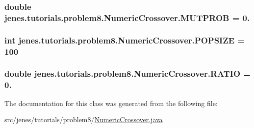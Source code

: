 \hypertarget{classjenes_1_1tutorials_1_1problem8_1_1_numeric_crossover_a4d0587e4b39b1f74efd20a0c921c38f7}{
\subsubsection[{M\-U\-T\-P\-R\-O\-B}]{\setlength{\rightskip}{0pt plus 5cm}double jenes.\-tutorials.\-problem8.\-Numeric\-Crossover.\-M\-U\-T\-P\-R\-O\-B = 0.\hspace{0.3cm}{\ttfamily [static]}}}\label{classjenes_1_1tutorials_1_1problem8_1_1_numeric_crossover_a4d0587e4b39b1f74efd20a0c921c38f7}
\hypertarget{classjenes_1_1tutorials_1_1problem8_1_1_numeric_crossover_a0a9b3b839ab6677dcbae723434df6551}{
\subsubsection[{P\-O\-P\-S\-I\-Z\-E}]{\setlength{\rightskip}{0pt plus 5cm}int jenes.\-tutorials.\-problem8.\-Numeric\-Crossover.\-P\-O\-P\-S\-I\-Z\-E = 100\hspace{0.3cm}{\ttfamily [static]}}}\label{classjenes_1_1tutorials_1_1problem8_1_1_numeric_crossover_a0a9b3b839ab6677dcbae723434df6551}
\hypertarget{classjenes_1_1tutorials_1_1problem8_1_1_numeric_crossover_ae3c1d4871321a6323d09add505679fe0}{
\subsubsection[{R\-A\-T\-I\-O}]{\setlength{\rightskip}{0pt plus 5cm}double jenes.\-tutorials.\-problem8.\-Numeric\-Crossover.\-R\-A\-T\-I\-O = 0.\hspace{0.3cm}{\ttfamily [static]}}}\label{classjenes_1_1tutorials_1_1problem8_1_1_numeric_crossover_ae3c1d4871321a6323d09add505679fe0}


The documentation for this class was generated from the following file\-:\begin{DoxyCompactItemize}
\item 
src/jenes/tutorials/problem8/\hyperlink{_numeric_crossover_8java}{Numeric\-Crossover.\-java}\end{DoxyCompactItemize}
